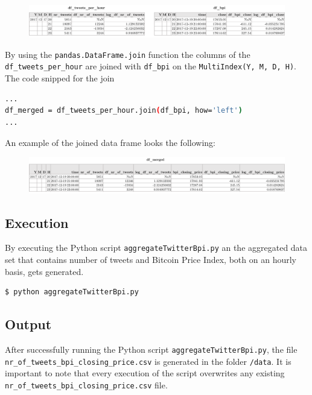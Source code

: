 \documentclass[a4paper,12pt]{article}
\begin{document}
\begin{spacing}{1.2}
\begin{figure}[H]
    \centering
    \includegraphics[scale=0.52]{dfseperate.png}
\end{figure}
By using the \verb|pandas.DataFrame.join| function the columns of the \verb|df_tweets_per_hour| are joined with  \verb|df_bpi| on the  \verb|MultiIndex(Y, M, D, H)|. The code snipped for the join \:
\begin{lstlisting}[language=bash]
...
df_merged = df_tweets_per_hour.join(df_bpi, how='left')
...
\end{lstlisting}
An example of the joined data frame looks the following:
\begin{figure}[H]
    \centering
    \includegraphics[scale=0.52]{dfmerged.png}
\end{figure}

\subsection{Execution}
By executing the Python script \verb|aggregateTwitterBpi.py| an the aggregated data set that contains number of tweets and Bitcoin Price Index, both on an hourly basis, gets generated. 
\begin{lstlisting}[language=bash]
    $ python aggregateTwitterBpi.py
\end{lstlisting}

\subsection{Output}
After successfully running the Python script \verb|aggregateTwitterBpi.py|, the file \\ \verb|nr_of_tweets_bpi_closing_price.csv| is generated in the folder \verb|/data|. It is important to note that every execution of the script overwrites any existing \\ \verb|nr_of_tweets_bpi_closing_price.csv| file.


\end{spacing}
\end{document}
